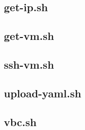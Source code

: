 \subsection{get-ip.sh}
\noindent


\subsection{get-vm.sh}
\noindent


\subsection{ssh-vm.sh}
\noindent


\subsection{upload-yaml.sh}
\noindent


\subsection{vbc.sh}
\noindent


